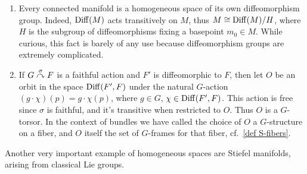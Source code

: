 \begin{example}
\begin{enumerate}
        \item Every connected manifold is a homogeneous space of its own diffeomorphism group. Indeed, $\operatorname{Diff}(M)$ acts transitively on $M$, thus $M\cong \operatorname{Diff}(M)\slash H$, where $H$ is the subgroup of diffeomorphisms fixing a basepoint $m_0\in M$. While curious, this fact is barely of any use because diffeomorphism groups are extremely complicated.
        
        \item If $G\overset{\sigma}{\curvearrowright}F$ is a faithful action and $F'$ is diffeomorphic to $F$, then let $O$ be an orbit in the space $\operatorname{Diff}(F',F)$ under the natural $G$-action $(g\cdot \chi)(p)=g\cdot\chi(p)$, where $g\in G$, $\chi\in\operatorname{Diff}(F',F)$. This action is free since $\sigma$ is faithful, and it's transitive when restricted to $O$. Thus $O$ is a $G$-torsor. In the context of bundles we have called the choice of $O$ a $G$-structure on a fiber, and $O$ itself the set of $G$-frames for that fiber, cf.\ \ref{def S-fibers}.
    \end{enumerate}
\end{example}

Another very important example of homogeneous spaces are Stiefel manifolds, arising from classical Lie groups.


